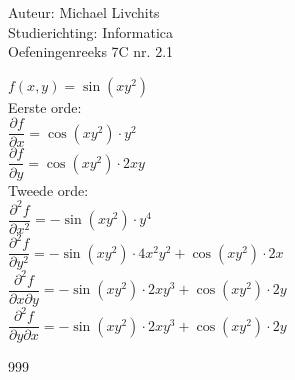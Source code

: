 \documentclass[a4paper]{article}
\begin{document}
  
\noindent \large Auteur: Michael Livchits \\
\noindent \large Studierichting: Informatica\\
\noindent \large Oefeningenreeks 7C nr. 2.1\\

\medskip

\normalsize

$f(x,y)= \sin(xy^2)$\\
	
Eerste orde:\\
	
$\dfrac{\partial f}{\partial x} = \cos(xy^2)\cdot y^2$\\
	
$\dfrac{\partial f}{\partial y} = \cos(xy^2)\cdot 2xy$\\

Tweede orde:\\
	
$\dfrac{\partial^2 f}{\partial x^2} = -\sin(xy^2)\cdot y^4$\\
	
$\dfrac{\partial^2 f}{\partial y^2} = -\sin(xy^2)\cdot 4x^2y^2 + \cos(xy^2)\cdot 2x$\\
	
$\dfrac{\partial^2 f}{\partial x\partial y} = -\sin(xy^2)\cdot 2xy^3 + \cos(xy^2)\cdot 2y$\\
	
$\dfrac{\partial^2 f}{\partial y\partial x} = -\sin(xy^2)\cdot 2xy^3 + \cos(xy^2)\cdot 2y$\\

\begin{thebibliography}{999}
\end{thebibliography}
\end{document}
